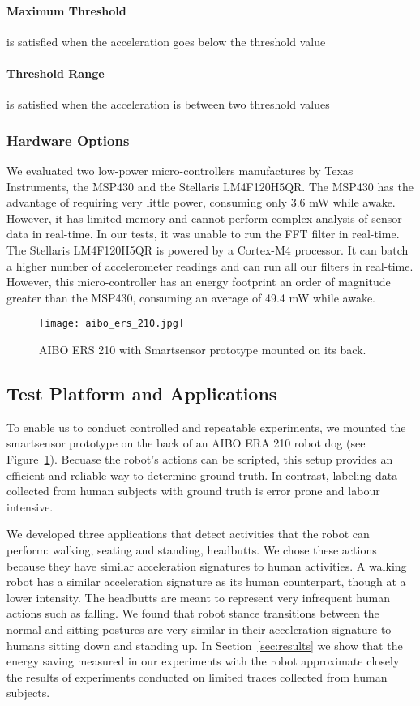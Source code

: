 \paragraph{Maximum Threshold} is satisfied when the acceleration goes below the threshold value

\paragraph{Threshold Range} is satisfied when the acceleration is between two threshold values


\subsubsection{Hardware Options}

We evaluated two low-power micro-controllers manufactures by Texas
Instruments, the MSP430 and the Stellaris LM4F120H5QR.  The MSP430 has
the advantage of requiring very little power, consuming only 3.6 mW
while awake. However, it has limited memory and cannot perform complex
analysis of sensor data in real-time. In our tests, it was unable to
run the FFT filter in real-time.  The Stellaris LM4F120H5QR is powered
by a Cortex-M4 processor. It can batch a higher number of accelerometer
readings and can run all our filters in real-time.  However, this
micro-controller has an energy footprint an order of magnitude greater
than the MSP430, consuming an average of 49.4 mW while awake.

\begin{figure}[t]
	\texttt{[image: aibo\_ers\_210.jpg]}
	\caption{AIBO ERS 210 with Smartsensor prototype mounted on its back.}
	\label{fig:aibo}
\end{figure}

\subsection{Test Platform and Applications}
\label{sec:applications}

To enable us to conduct controlled and repeatable experiments, we
mounted the smartsensor prototype on the back of an AIBO ERA 210 robot
dog (see Figure~\ref{fig:aibo}).  Becuase the robot's actions can be
scripted, this setup provides an efficient and reliable way to
determine ground truth.  In contrast, labeling data collected from
human subjects with ground truth is error prone and labour intensive.

We developed three applications that detect activities that the robot
can perform: walking, seating and standing, headbutts.  We chose these
actions because they have similar acceleration signatures to human
activities. A walking robot has a similar acceleration signature as
its human counterpart, though at a lower intensity. The headbutts are
meant to represent very infrequent human actions such as falling. We
found that robot stance transitions between the normal and sitting
postures are very similar in their acceleration signature to humans
sitting down and standing up.  In Section~\ref{sec:results} we show
that the energy saving measured in our experiments with the robot
approximate closely the results of experiments conducted on limited
traces collected from human subjects.


